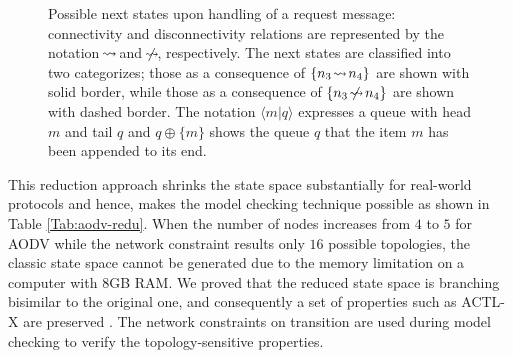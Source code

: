 \begin{figure}
	\caption{Possible next states upon handling of a request message: connectivity and disconnectivity relations are represented by the notation $\!\rightsquigarrow\! $ and $\!\mathrel{\hspace{.1em}\not\hspace{-.1em}\rightsquigarrow}\!$, respectively. The next states are classified into two categorizes; those as a consequence of $\{n_3\!\rightsquigarrow\! n_4\}$ are shown with solid border, while those as a consequence of $\{n_3\!\mathrel{\hspace{.1em}\not\hspace{-.1em}\rightsquigarrow}\! n_4\}$ are shown with dashed border. The notation $\langle m|q\rangle$ expresses a queue with head $m$ and tail $q$ and $q\oplus\{m\}$ shows the queue $q$ that the item $m$ has been appended to its end.}\label{Fig::reduction}
\end{figure}
%
This reduction approach shrinks the state space substantially for real-world protocols and hence, makes the model checking technique possible as shown in Table \ref{Tab:aodv-redu}. When the number of nodes increases from $4$ to $5$ for AODV while the network constraint results only $16$ possible topologies, the classic state space cannot be generated due to the memory limitation on a computer with $8${GB} {RAM}.  We proved that the reduced state space is branching bisimilar to the
original one, and consequently a set of properties such as {ACTL-X} are preserved \cite{FOAC}. The network constraints on transition are used during model checking \cite{FORM,CSI2018} to verify the topology-sensitive properties. 


